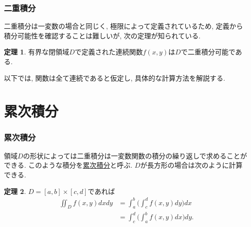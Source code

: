 \documentclass[dvipdfmx,cjk,10.2pt]{beamer}
\theoremstyle{definition}
\newtheorem{Thm}{定理}[section]
\begin{document}


\begin{frame}
\frametitle{二重積分}

二重積分は一変数の場合と同じく, 極限によって定義されているため, 
定義から積分可能性を確認することは難しいが, 次の定理が知られている. 

\begin{Thm}
有界な閉領域$D$で定義された連続関数$f(x,y)$は$D$で二重積分可能である. 
\end{Thm}

以下では, 関数は全て連続であると仮定し, 具体的な計算方法を解説する. 

\end{frame}


\section{累次積分}


\begin{frame}
\frametitle{累次積分}


領域$D$の形状によっては二重積分は一変数関数の積分の繰り返しで求めることができる. 
このような積分を\underline{累次積分}と呼ぶ. 
$D$が長方形の場合は次のように計算できる.  


\begin{Thm}
$D=[a,b]\times [c,d]$であれば
\begin{align*}
\iint_Df(x,y)dxdy &= \int_a^b\big( \int_c^d f(x,y)dy\big)dx \\
& = \int_c^d\big( \int_a^b f(x,y)dx\big)dy.
\end{align*}
\end{Thm}

\end{frame}


\end{document}
